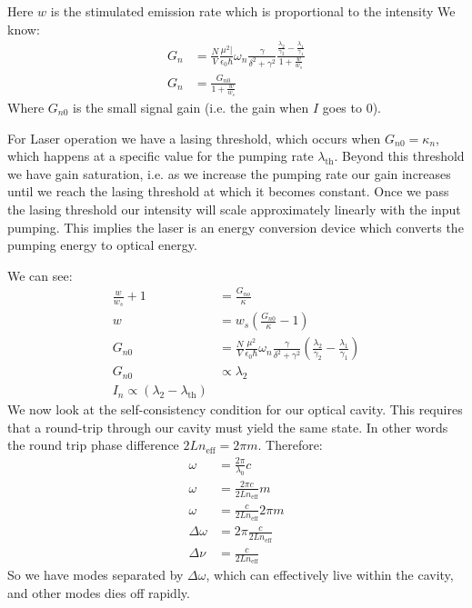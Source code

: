Here $w$ is the stimulated emission rate which is proportional to the intensity We know:
\begin{align*}
	G_n &= \frac{N}{V} \frac{\mu^2|}{\epsilon_0\hbar}\omega_n \frac{\gamma}{\delta^2 + \gamma^2} \frac{\frac{\lambda_2}{\gamma_2} - \frac{\lambda_1}{\gamma_1}}{1 + \frac{w}{w_s}} \\
	G_n &= \frac{G_{n0}}{1 + \frac{w}{w_s}}
\end{align*}
Where $G_{n0}$ is the small signal gain (i.e. the gain when $I$ goes to 0).

For Laser operation we have a lasing threshold, which occurs when $G_{n0} = \kappa_n$, which happens at a specific value for the pumping rate $\lambda_\text{th}$.
Beyond this threshold we have gain saturation, i.e. as we increase the pumping rate our gain increases until we reach the lasing threshold at which it becomes constant.
Once we pass the lasing threshold our intensity will scale approximately linearly with the input pumping.
This implies the laser is an energy conversion device which converts the pumping energy to optical energy.

We can see:
\begin{align*}
	\frac{w}{w_s} + 1 &= \frac{G_{no}}{\kappa} \\
	w &= w_s \left(\frac{G_{n0}}{\kappa} -1\right) \\
	G_{n0} &= \frac{N}{V} \frac{\mu^2}{\epsilon_0 \hbar} \omega_n \frac{\gamma}{\delta^2 + \gamma^2} \left(\frac{\lambda_2}{\gamma_2}  - \frac{\lambda_1}{\gamma_1}\right) \\
	G_{n0} &\propto \lambda_2 \\
	I_n \propto (\lambda_2 - \lambda_\text{th})
\end{align*}
We now look at the self-consistency condition for our optical cavity. This requires that a round-trip through our cavity must yield the same state. In other words the round trip phase difference $2Ln_\text{eff} = 2\pi m$. Therefore:
\begin{align*}
	\omega &= \frac{2\pi}{\lambda_0} c \\
	\omega &= \frac{2\pi c }{2L n_\text{eff}} m \\
	\omega &= \frac{c}{2L n_\text{eff}} 2\pi m \\
	\Delta\omega &= 2\pi \frac{c}{2Ln_\text{eff}} \\
	\Delta \nu &= \frac{c}{2Ln_\text{eff}}
\end{align*}
So we have modes separated by $\Delta\omega$, which can effectively live within the cavity, and other modes dies off rapidly.
